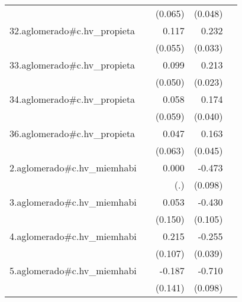 {\begin{longtable}{l*{4}{D{.}{.}{-1}}}
            &                     &     (0.065)         &     (0.048)         &                     \\
\addlinespace
32.aglomerado#c.hv\_propieta&                     &       0.117\sym{*}  &       0.232\sym{***}&                     \\
            &                     &     (0.055)         &     (0.033)         &                     \\
\addlinespace
33.aglomerado#c.hv\_propieta&                     &       0.099\sym{*}  &       0.213\sym{***}&                     \\
            &                     &     (0.050)         &     (0.023)         &                     \\
\addlinespace
34.aglomerado#c.hv\_propieta&                     &       0.058         &       0.174\sym{***}&                     \\
            &                     &     (0.059)         &     (0.040)         &                     \\
\addlinespace
36.aglomerado#c.hv\_propieta&                     &       0.047         &       0.163\sym{***}&                     \\
            &                     &     (0.063)         &     (0.045)         &                     \\
\addlinespace
2.aglomerado#c.hv\_miemhabi&                     &       0.000         &      -0.473\sym{***}&                     \\
            &                     &         (.)         &     (0.098)         &                     \\
\addlinespace
3.aglomerado#c.hv\_miemhabi&                     &       0.053         &      -0.430\sym{***}&                     \\
            &                     &     (0.150)         &     (0.105)         &                     \\
\addlinespace
4.aglomerado#c.hv\_miemhabi&                     &       0.215\sym{*}  &      -0.255\sym{***}&                     \\
            &                     &     (0.107)         &     (0.039)         &                     \\
\addlinespace
5.aglomerado#c.hv\_miemhabi&                     &      -0.187         &      -0.710\sym{***}&                     \\
            &                     &     (0.141)         &     (0.098)         &                     \\

\end{longtable}}
